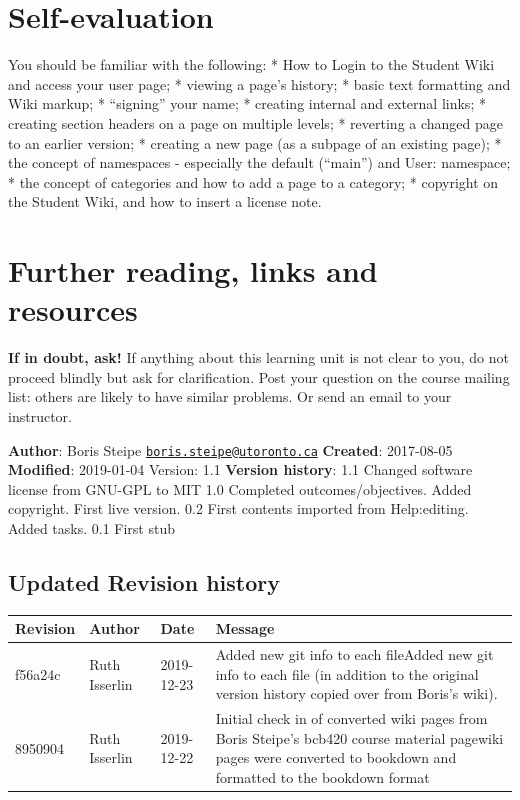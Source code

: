 \documentclass[]{book}
\let\BeginKnitrBlock\begin \let\EndKnitrBlock\end
\begin{document}
\section{Self-evaluation}\label{self-evaluation}

You should be familiar with the following: * How to Login to the Student
Wiki and access your user page; * viewing a page's history; * basic text
formatting and Wiki markup; * ``signing'' your name; * creating internal
and external links; * creating section headers on a page on multiple
levels; * reverting a changed page to an earlier version; * creating a
new page (as a subpage of an existing page); * the concept of namespaces
- especially the default (``main'') and User: namespace; * the concept
of categories and how to add a page to a category; * copyright on the
Student Wiki, and how to insert a license note.

\section{Further reading, links and
resources}\label{further-reading-links-and-resources}

\textbf{If in doubt, ask!} If anything about this learning unit is not
clear to you, do not proceed blindly but ask for clarification. Post
your question on the course mailing list: others are likely to have
similar problems. Or send an email to your instructor.

\BeginKnitrBlock{rmd-original-history}
\textbf{Author}: Boris Steipe
\href{mailto:boris.steipe@utoronto.ca}{\nolinkurl{boris.steipe@utoronto.ca}}
\textbf{Created}: 2017-08-05 \textbf{Modified}: 2019-01-04 Version: 1.1
\textbf{Version history}: 1.1 Changed software license from GNU-GPL to
MIT 1.0 Completed outcomes/objectives. Added copyright. First live
version. 0.2 First contents imported from Help:editing. Added tasks. 0.1
First stub
\EndKnitrBlock{rmd-original-history}

\subsection{Updated Revision history}\label{updated-revision-history}

\begin{tabular}{l|l|l|l}
\hline
Revision & Author & Date & Message\\
\hline
f56a24c & Ruth Isserlin & 2019-12-23 & Added new git info to each fileAdded new git info to each file (in addition to the original version history copied over from Boris's wiki).\\
\hline
8950904 & Ruth Isserlin & 2019-12-22 & Initial check in of converted wiki pages from Boris Steipe's bcb420 course material pagewiki pages were converted to bookdown and formatted to the bookdown format\\
\hline
\end{tabular}
\end{document}
